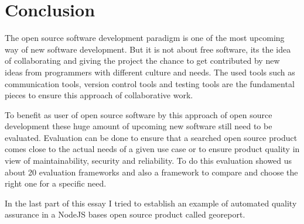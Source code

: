 \documentclass[DIV=calc,paper=a4,fontsize=9pt,twocolumn]{scrartcl}
\begin{document}
\section{Conclusion}

The open source software development paradigm is one of the most upcoming way of new software development. But it is not about free software, its the idea of collaborating and giving the project the chance to get contributed by new ideas from programmers with different culture and needs. The used tools such as communication tools, version control tools and testing tools are the fundamental pieces to ensure this approach of collaborative work.

To benefit as user of open source software by this approach of open source development these huge amount of upcoming new software still need to be evaluated. Evaluation can be done to ensure that a searched open source product comes close to the actual needs of a given use case or to ensure product quality in view of maintainability, security and reliability. To do this evaluation \citet{stol2010comparison} showed us about 20 evaluation frameworks and also a framework to compare and choose the right one for a specific need.

In the last part of this essay I tried to establish an example of automated quality assurance in a NodeJS bases open source product called georeport.


\end{document}
